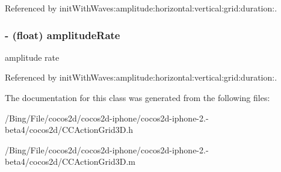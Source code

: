 Referenced by init\-With\-Waves\-:amplitude\-:horizontal\-:vertical\-:grid\-:duration\-:.

\hypertarget{interface_c_c_waves_a86d4f9c57411c5b5e76a5d38b9435cb2}{
\subsubsection[{amplitude\-Rate}]{\setlength{\rightskip}{0pt plus 5cm}-\/ (float) {\bf amplitude\-Rate}}}\label{interface_c_c_waves_a86d4f9c57411c5b5e76a5d38b9435cb2}
amplitude rate 

Referenced by init\-With\-Waves\-:amplitude\-:horizontal\-:vertical\-:grid\-:duration\-:.



The documentation for this class was generated from the following files\-:\begin{DoxyCompactItemize}
\item 
/\-Bing/\-File/cocos2d/cocos2d-\/iphone/cocos2d-\/iphone-\/2.-\/beta4/cocos2d/C\-C\-Action\-Grid3\-D.\-h\item 
/\-Bing/\-File/cocos2d/cocos2d-\/iphone/cocos2d-\/iphone-\/2.-\/beta4/cocos2d/C\-C\-Action\-Grid3\-D.\-m\end{DoxyCompactItemize}

